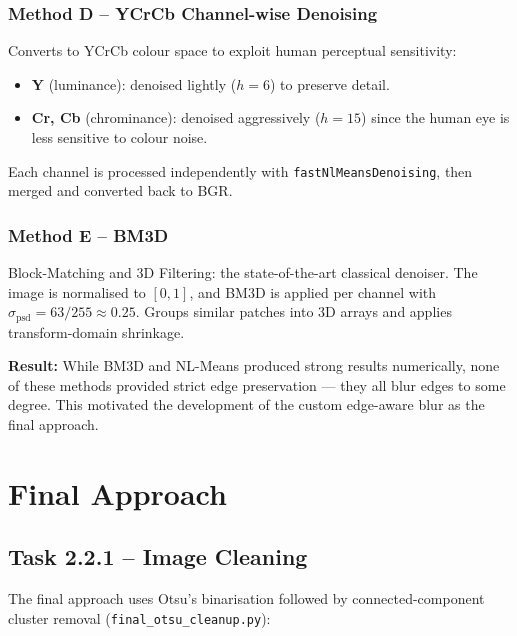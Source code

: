 \documentclass[conference, twocolumn]{IEEEtran}
\begin{document}
\subsubsection{Method D -- YCrCb Channel-wise Denoising}
Converts to YCrCb colour space to exploit human perceptual sensitivity:
\begin{itemize}
    \item \textbf{Y} (luminance): denoised lightly ($h=6$) to preserve detail.
    \item \textbf{Cr, Cb} (chrominance): denoised aggressively ($h=15$) since the human eye is less sensitive to colour noise.
\end{itemize}
Each channel is processed independently with \texttt{fastNlMeansDenoising}, then merged and converted back to BGR.

\subsubsection{Method E -- BM3D}
Block-Matching and 3D Filtering: the state-of-the-art classical denoiser. The image is normalised to $[0,1]$, and BM3D is applied per channel with $\sigma_{\text{psd}} = 63/255 \approx 0.25$. Groups similar patches into 3D arrays and applies transform-domain shrinkage.

\textbf{Result:} While BM3D and NL-Means produced strong results numerically, none of these methods provided strict edge preservation --- they all blur edges to some degree. This motivated the development of the custom edge-aware blur as the final approach.

\section{Final Approach}

\subsection{Task 2.2.1 -- Image Cleaning}

The final approach uses Otsu's binarisation followed by connected-component cluster removal (\texttt{final\_otsu\_cleanup.py}):
\end{document}
